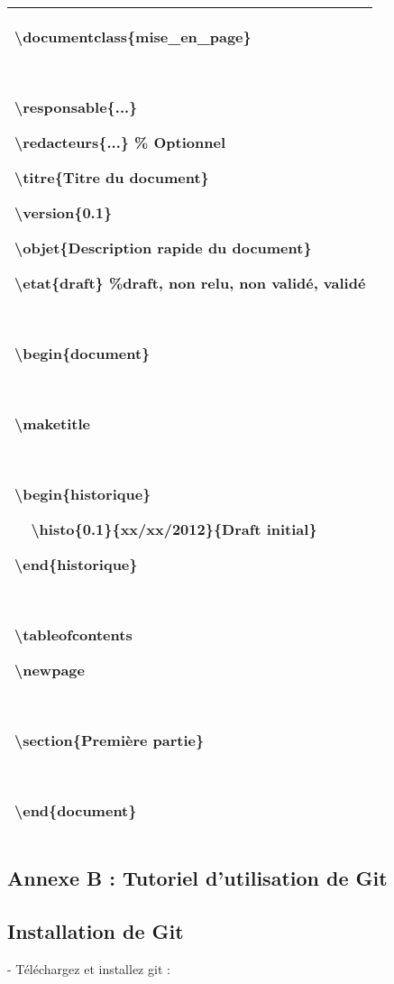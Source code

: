 \documentclass{mise_en_page}
\begin{document}
\begin{flushleft}
\tablehead{}
\begin{supertabular}{|m{16.345cm}|}
\hline
{\textbackslash}documentclass\{mise\_en\_page\}

~

{\textbackslash}responsable\{...\}

{\textbackslash}redacteurs\{...\} \% Optionnel

{\textbackslash}titre\{Titre du document\}

{\textbackslash}version\{0.1\}

{\textbackslash}objet\{Description rapide du document\}

{\textbackslash}etat\{draft\} \%draft, non relu, non validé, validé

~

{\textbackslash}begin\{document\}

~

{\textbackslash}maketitle

~

{\textbackslash}begin\{historique\}

\ \ {\textbackslash}histo\{0.1\}\{xx/xx/2012\}\{Draft initial\}

{\textbackslash}end\{historique\}

~

{\textbackslash}tableofcontents

{\textbackslash}newpage

~

{\textbackslash}section\{Première partie\}

~

{\textbackslash}end\{document\}\\\hline
\end{supertabular}
\end{flushleft}



\subsection{Annexe B : Tutoriel d’utilisation de Git}



\subsection{Installation de Git}



{}- Téléchargez et installez git :
\end{document}
